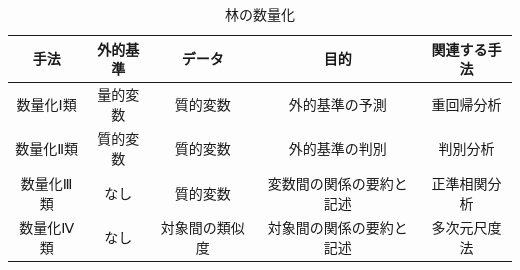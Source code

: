 \begin{table}[ht]
	\caption{林の数量化}
	\begin{tabular}{c|c|c|c|c}
		手法    & 外的基準 & データ     & 目的           & 関連する手法 \\
		\hline
		数量化Ⅰ類 & 量的変数 & 質的変数    & 外的基準の予測      & 重回帰分析  \\
		数量化Ⅱ類 & 質的変数 & 質的変数    & 外的基準の判別      & 判別分析   \\
		数量化Ⅲ類 & なし   & 質的変数    & 変数間の関係の要約と記述 & 正準相関分析 \\
		数量化Ⅳ類 & なし   & 対象間の類似度 & 対象間の関係の要約と記述 & 多次元尺度法 \\
	\end{tabular}
	\label{tbl::14_03}
\end{table}

